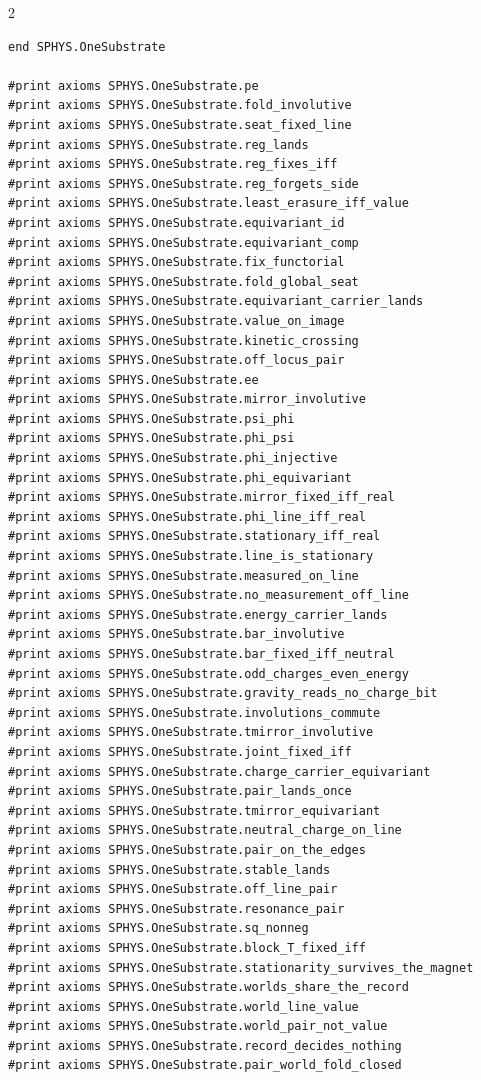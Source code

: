\documentclass[10pt]{article}
\begin{document}
\begin{multicols}{2}
\begin{Verbatim}[fontsize=\fontsize{6.2}{7.2}\selectfont,breaklines,breakanywhere,breaksymbolleft={}]
end SPHYS.OneSubstrate

#print axioms SPHYS.OneSubstrate.pe
#print axioms SPHYS.OneSubstrate.fold_involutive
#print axioms SPHYS.OneSubstrate.seat_fixed_line
#print axioms SPHYS.OneSubstrate.reg_lands
#print axioms SPHYS.OneSubstrate.reg_fixes_iff
#print axioms SPHYS.OneSubstrate.reg_forgets_side
#print axioms SPHYS.OneSubstrate.least_erasure_iff_value
#print axioms SPHYS.OneSubstrate.equivariant_id
#print axioms SPHYS.OneSubstrate.equivariant_comp
#print axioms SPHYS.OneSubstrate.fix_functorial
#print axioms SPHYS.OneSubstrate.fold_global_seat
#print axioms SPHYS.OneSubstrate.equivariant_carrier_lands
#print axioms SPHYS.OneSubstrate.value_on_image
#print axioms SPHYS.OneSubstrate.kinetic_crossing
#print axioms SPHYS.OneSubstrate.off_locus_pair
#print axioms SPHYS.OneSubstrate.ee
#print axioms SPHYS.OneSubstrate.mirror_involutive
#print axioms SPHYS.OneSubstrate.psi_phi
#print axioms SPHYS.OneSubstrate.phi_psi
#print axioms SPHYS.OneSubstrate.phi_injective
#print axioms SPHYS.OneSubstrate.phi_equivariant
#print axioms SPHYS.OneSubstrate.mirror_fixed_iff_real
#print axioms SPHYS.OneSubstrate.phi_line_iff_real
#print axioms SPHYS.OneSubstrate.stationary_iff_real
#print axioms SPHYS.OneSubstrate.line_is_stationary
#print axioms SPHYS.OneSubstrate.measured_on_line
#print axioms SPHYS.OneSubstrate.no_measurement_off_line
#print axioms SPHYS.OneSubstrate.energy_carrier_lands
#print axioms SPHYS.OneSubstrate.bar_involutive
#print axioms SPHYS.OneSubstrate.bar_fixed_iff_neutral
#print axioms SPHYS.OneSubstrate.odd_charges_even_energy
#print axioms SPHYS.OneSubstrate.gravity_reads_no_charge_bit
#print axioms SPHYS.OneSubstrate.involutions_commute
#print axioms SPHYS.OneSubstrate.tmirror_involutive
#print axioms SPHYS.OneSubstrate.joint_fixed_iff
#print axioms SPHYS.OneSubstrate.charge_carrier_equivariant
#print axioms SPHYS.OneSubstrate.pair_lands_once
#print axioms SPHYS.OneSubstrate.tmirror_equivariant
#print axioms SPHYS.OneSubstrate.neutral_charge_on_line
#print axioms SPHYS.OneSubstrate.pair_on_the_edges
#print axioms SPHYS.OneSubstrate.stable_lands
#print axioms SPHYS.OneSubstrate.off_line_pair
#print axioms SPHYS.OneSubstrate.resonance_pair
#print axioms SPHYS.OneSubstrate.sq_nonneg
#print axioms SPHYS.OneSubstrate.block_T_fixed_iff
#print axioms SPHYS.OneSubstrate.stationarity_survives_the_magnet
#print axioms SPHYS.OneSubstrate.worlds_share_the_record
#print axioms SPHYS.OneSubstrate.world_line_value
#print axioms SPHYS.OneSubstrate.world_pair_not_value
#print axioms SPHYS.OneSubstrate.record_decides_nothing
#print axioms SPHYS.OneSubstrate.pair_world_fold_closed

\end{Verbatim}
\end{multicols}
\end{document}
